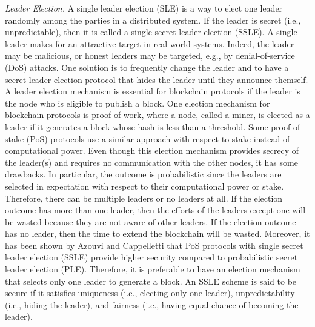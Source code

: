 \smallskip
\noindent \emph{Leader Election.} 
A single leader election (SLE) is a way to elect one leader randomly among the
parties in a distributed system. If the leader is secret (i.e., unpredictable), then it is called
a single secret leader election (SSLE).
A single leader makes for an attractive target in real-world systems. Indeed, the leader may be malicious, or honest leaders may be targeted, e.g.,
by denial-of-service (DoS) attacks. One solution is to frequently change the leader and
to have a secret leader election protocol that hides the leader until they announce themself.
A leader election mechanism is essential for blockchain protocols if the leader is
the node who is eligible to publish a block.
One election mechanism for blockchain protocols is proof of work, where a node, called a miner, is elected as a leader if it generates a block whose hash is less than a threshold. Some
proof-of-stake (PoS) protocols \cite{DaianPS19,KiayiasRDO17,DavidGKR18,Dfinity} use a similar approach with respect to stake instead of computational power. Even though this election mechanism provides secrecy of
the leader(s) and requires no communication with the other nodes, it has some drawbacks. In particular, the outcome is probabilistic since the leaders are selected in expectation
with respect to their computational power or stake. Therefore, there can be multiple leaders or
no leaders at all. If the election outcome has more than one leader, then the efforts of the leaders
except one will be wasted because they are not aware of other leaders. If the election outcome has
no leader, then the time to extend the blockchain will be wasted. Moreover,
it has been shown by Azouvi and Cappelletti \cite{AzouviC21} that PoS protocols with single secret leader
election (SSLE) provide higher security compared to probabilistic secret leader election (PLE).
Therefore, it is preferable to have an election mechanism that selects only one leader to generate a
block.
An SSLE scheme is said to be secure \cite{BonehEHG20} if it satisfies uniqueness (i.e., electing only one leader), unpredictability (i.e., hiding the leader), and fairness (i.e., having equal chance of becoming the leader).

